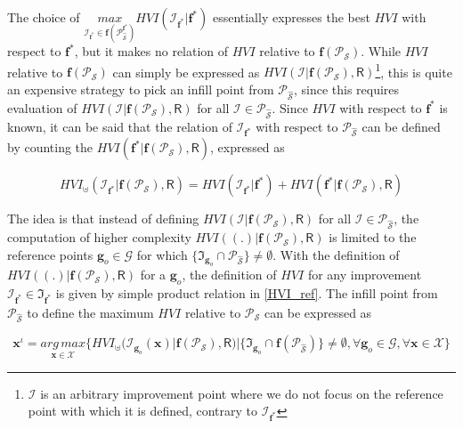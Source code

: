 The choice of $\underset{\mathscr{I}_{\bm f^*} \in \bm f(\mathscr{P}_{\hat{\mathcal{S}}}^{\bm f^*})}{max} HVI(\mathscr{I}_{\bm f^*}|{\bm f^*})$ essentially expresses the best $HVI$ with respect to $\bm f^*$, but it makes no relation of $HVI$ relative to $\bm f(\mathscr{P}_{\mathcal S})$. 
While $HVI$ relative to $\bm f(\mathscr{P}_{\mathcal S})$ can simply be expressed as ${HVI}(\mathscr{I} |\bm f(\mathscr{P}_{\mathcal{S}}), \bm{\mathsf{R}})$\footnote{$\mathscr{I}$ is an arbitrary improvement point where we do not focus on the reference point with which it is defined, contrary to $\mathscr{I}_{\bm f^*}$}, this is quite an expensive strategy to pick an infill point from $\mathscr{P}_{\hat{\mathcal{S}}}$, since this requires evaluation of ${HVI}(\mathscr{I} |\bm f(\mathscr{P}_{\mathcal{S}}), \bm{\mathsf{R}})$ for all $\mathscr{I} \in  \mathscr{P}_{\hat{\mathcal{S}}}$. Since $HVI$ with respect to $\bm f^*$ is known, it can be said that the relation of $\mathscr{I}_{\bm f^*}$  with respect to $\mathscr{P}_{\hat{\mathcal{S}}}$ can be defined by counting the ${HVI}({\bm f^*} |\bm f(\mathscr{P}_{\mathcal{S}}), \bm{\mathsf{R}})$, expressed as

\begin{equation}
HVI_{\uplus}(\mathscr{I}_{\bm f^*}|\bm f(\mathscr{P}_{\mathcal{S}}), \bm{\mathsf{R}})=HVI(\mathscr{I}_{\bm f^*}|{\bm f^*})+
{HVI}({\bm f^*} |\bm f(\mathscr{P}_{\mathcal{S}}), \bm{\mathsf{R}})
\end{equation} 

The idea is that instead of defining ${HVI}(\mathscr{I} |\bm f(\mathscr{P}_{\mathcal{S}}), \bm{\mathsf{R}})$ for all $\mathscr{I} \in  \mathscr{P}_{\hat{\mathcal{S}}}$, the computation of  higher complexity $HVI((.)|\bm f(\mathscr{P}_{\mathcal{S}}), \bm{\mathsf{R}})$ is limited to the reference points $\bm g_o \in \mathscr{G}$ for which $\{ \mathfrak{I}_{\bm g_o} \cap \mathscr{P}_{\hat{\mathcal{S}}}\} \neq \emptyset$. With the definition of $HVI((.)|\bm f(\mathscr{P}_{\mathcal{S}}), \bm{\mathsf{R}})$ for a $\bm g_o$, the definition of $HVI$ for any improvement  
$\mathscr{I}_{\bm f^*} \in \mathfrak{I}_{\bm f^*}$ is given by simple product relation in \eqref{HVI_ref}. The infill point from ${\mathscr P}_{\hat{\mathcal S}}$ to define the maximum $HVI$ relative to $\mathscr P_{\mathcal S}$ can be expressed as

\begin{equation}
\bm x^{\iota}= \underset{\bm x \in \mathcal{X}}{arg\, max} \Big\{ HVI_{\uplus}(\mathscr{I}_{\bm g_o}(\bm x)|\bm f(\mathscr{P}_{\mathcal{S}}),\bm{\mathsf{R}})|  \{\mathfrak{I}_{\bm g_o}\cap \bm f(\mathscr{P}_{\hat{\mathcal S}})\} \neq \emptyset, \forall \bm g_o \in\mathscr{G},\forall \bm x \in \mathcal{X} \Big\}
\end{equation} 

